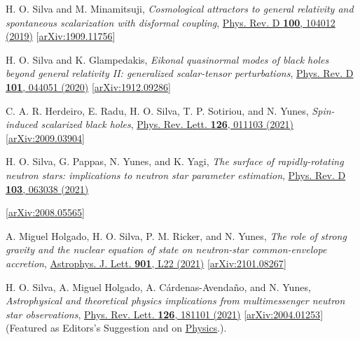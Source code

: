\documentclass[10pt]{article}
\begin{document}
\begin{bibenum}
    \item H. O. Silva and M. Minamitsuji,
    \emph{Cosmological attractors to general relativity and spontaneous scalarization with disformal coupling},
    \href{https://link.aps.org/doi/10.1103/PhysRevD.100.104012}{Phys. Rev. D {\bf 100}, 104012 (2019)}
    [\href{https://arxiv.org/abs/1909.11756}{arXiv:1909.11756}]

    \item H. O. Silva and K. Glampedakis,
    \emph{Eikonal quasinormal modes of black holes beyond general relativity II: generalized scalar-tensor perturbations},
    \href{https://journals.aps.org/prd/abstract/10.1103/PhysRevD.101.044051}{Phys. Rev. D {\bf 101}, 044051 (2020)}
    [\href{https://arxiv.org/abs/1912.09286}{arXiv:1912.09286}]

    \item C. A. R. Herdeiro, E. Radu, H. O. Silva, T. P. Sotiriou, and N. Yunes,
    \emph{Spin-induced scalarized black holes},
    \href{https://journals.aps.org/prl/abstract/10.1103/PhysRevLett.126.011103}{Phys. Rev. Lett. {\bf 126}, 011103 (2021)}
    [\href{https://arxiv.org/abs/2009.03904}{arXiv:2009.03904}]

    \item H. O. Silva, G. Pappas, N. Yunes, and K. Yagi,
    \emph{The surface of rapidly-rotating neutron stars: implications to neutron star parameter estimation},
    \href{https://journals.aps.org/prd/abstract/10.1103/PhysRevD.103.063038}{Phys. Rev. D {\bf 103}, 063038 (2021)}
    \begin{sloppypar}[\href{https://arxiv.org/abs/2008.05565}{arXiv:2008.05565}]\end{sloppypar}

    \item A. Miguel Holgado, H. O. Silva, P. M. Ricker, and N. Yunes,
    \emph{The role of strong gravity and the nuclear equation of state on neutron-star common-envelope accretion},
    \href{https://iopscience.iop.org/article/10.3847/2041-8213/abecdd}{Astrophys. J. Lett. {\bf 901}, L22 (2021)}
    [\href{https://arxiv.org/abs/2102.08267}{arXiv:2101.08267}]

    \item H. O. Silva, A. Miguel Holgado, A. C\'{a}rdenas-Avenda\~{n}o, and N. Yunes,
    \emph{Astrophysical and theoretical physics implications from multimessenger neutron star observations},
    \href{https://journals.aps.org/prl/abstract/10.1103/PhysRevLett.126.181101}{Phys. Rev. Lett. {\bf 126}, 181101 (2021)}
    [\href{https://arxiv.org/abs/2004.01253}{arXiv:2004.01253}]
    (Featured as {\color{venetianred}\sc Editors's Suggestion} and on \href{https://physics.aps.org/articles/v14/66}{Physics}.).
    \label{pub:SilvaPRL2021Nicer}


\end{bibenum}
\end{document}
